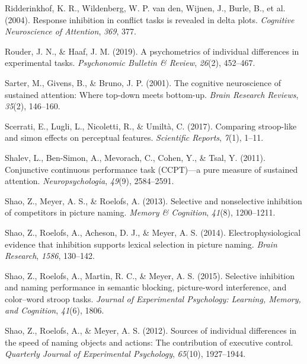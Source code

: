 \documentclass[
  man,floatsintext]{apa6}
\newlength{\cslhangindent}
\newlength{\cslentryspacingunit} %
\newenvironment{CSLReferences}[2] %
 {%
  \setlength{\parindent}{0pt}
  \ifodd #1
  \let\oldpar\par
  \def\par{\hangindent=\cslhangindent\oldpar}
  \fi
  \setlength{\parskip}{#2\cslentryspacingunit}
 }%
 {}
\begin{document}
\begin{CSLReferences}{1}{0}
\leavevmode{}%
Ridderinkhof, K. R., Wildenberg, W. P. van den, Wijnen, J., Burle, B., et al. (2004). Response inhibition in conflict tasks is revealed in delta plots. \emph{Cognitive Neuroscience of Attention}, \emph{369}, 377.

\leavevmode{}%
Rouder, J. N., \& Haaf, J. M. (2019). A psychometrics of individual differences in experimental tasks. \emph{Psychonomic Bulletin \& Review}, \emph{26}(2), 452--467.

\leavevmode{}%
Sarter, M., Givens, B., \& Bruno, J. P. (2001). The cognitive neuroscience of sustained attention: Where top-down meets bottom-up. \emph{Brain Research Reviews}, \emph{35}(2), 146--160.

\leavevmode{}%
Scerrati, E., Lugli, L., Nicoletti, R., \& Umiltà, C. (2017). Comparing stroop-like and simon effects on perceptual features. \emph{Scientific Reports}, \emph{7}(1), 1--11.

\leavevmode{}%
Shalev, L., Ben-Simon, A., Mevorach, C., Cohen, Y., \& Tsal, Y. (2011). Conjunctive continuous performance task (CCPT)---a pure measure of sustained attention. \emph{Neuropsychologia}, \emph{49}(9), 2584--2591.

\leavevmode{}%
Shao, Z., Meyer, A. S., \& Roelofs, A. (2013). Selective and nonselective inhibition of competitors in picture naming. \emph{Memory \& Cognition}, \emph{41}(8), 1200--1211.

\leavevmode{}%
Shao, Z., Roelofs, A., Acheson, D. J., \& Meyer, A. S. (2014). Electrophysiological evidence that inhibition supports lexical selection in picture naming. \emph{Brain Research}, \emph{1586}, 130--142.

\leavevmode{}%
Shao, Z., Roelofs, A., Martin, R. C., \& Meyer, A. S. (2015). Selective inhibition and naming performance in semantic blocking, picture-word interference, and color--word stroop tasks. \emph{Journal of Experimental Psychology: Learning, Memory, and Cognition}, \emph{41}(6), 1806.

\leavevmode{}%
Shao, Z., Roelofs, A., \& Meyer, A. S. (2012). Sources of individual differences in the speed of naming objects and actions: The contribution of executive control. \emph{Quarterly Journal of Experimental Psychology}, \emph{65}(10), 1927--1944.


\end{CSLReferences}
\end{document}
